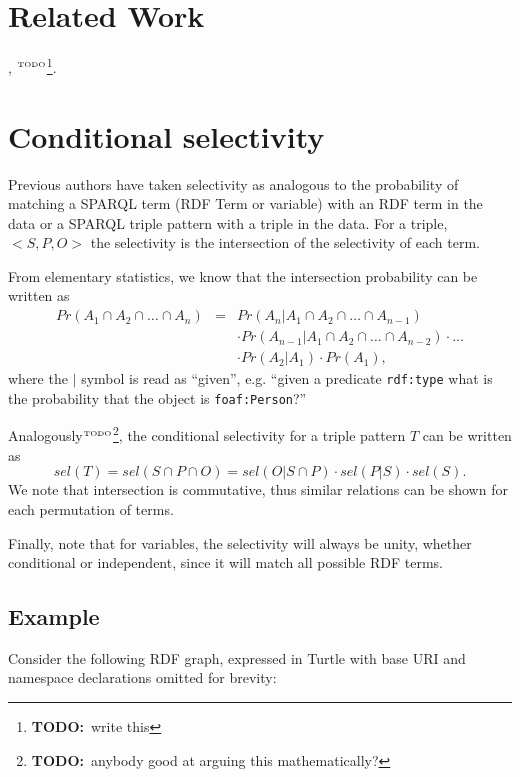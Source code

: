 \documentclass[12pt, draft]{article}
\newcommand{\rdfterm}[1]{\texttt{#1}}
\newcommand{\todo}[1]{\ensuremath{^{\textrm{\tiny{TODO}\normalsize}}}\footnote{\textbf{TODO:}~#1}}
\newcommand{\sel}[1]{\ensuremath{sel\left(#1\right)}}
\begin{document}
\section{Related Work}

\cite{splendid}, \cite{wodqa} \todo{write this}.

\section{Conditional selectivity}\label{sec:cond}

Previous authors have taken selectivity as analogous to the
probability of matching a SPARQL term (RDF Term or variable) with an
RDF term in the data or a SPARQL triple pattern with a triple in the
data.  For a triple, $<S, P, O>$ the selectivity is the intersection
of the selectivity of each term.

From elementary statistics, we know that the intersection probability
can be written as
\begin{eqnarray}
Pr(A_1 \cap A_2  \cap \ldots \cap A_n) &=& 
  Pr(A_n | A_1 \cap A_2  \cap \ldots \cap A_{n-1}) \nonumber\\
  &&\cdot Pr(A_{n-1} | A_1 \cap A_2  \cap \ldots \cap A_{n-2}) \cdot \ldots \nonumber\\
  && \cdot Pr(A_2 | A_1) \cdot Pr(A_1) ,
\end{eqnarray}
where the $|$ symbol is read as ``given'', e.g. ``given a predicate
\rdfterm{rdf:type} what is the probability that the object is \rdfterm{foaf:Person}?''

Analogously\todo{anybody good at arguing this mathematically?}, the
conditional selectivity for a triple pattern $T$ can be written as 
\begin{equation}\label{eq:sel}
\sel{T} = \sel{S \cap P \cap O} = \sel{O | S \cap P} \cdot \sel{P | S}
\cdot \sel{S} . 
\end{equation}
We note that intersection is commutative, thus similar
relations can be shown for each permutation of terms.

Finally, note that for variables, the selectivity will always be
unity, whether conditional or independent, since it will match all
possible RDF terms.

\subsection{Example}\label{sec:example}

Consider the following RDF graph, expressed in Turtle with base URI
and namespace declarations omitted for brevity:
\end{document}
